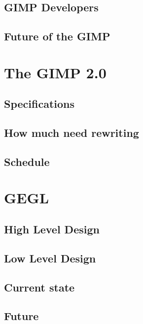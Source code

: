 \documentclass{report}
\begin{document}
\section{GIMP Developers}
\section{Future of the GIMP} 


\chapter{The GIMP 2.0}

\section{Specifications}
\section{How much need rewriting}
\section{Schedule}

\chapter{GEGL}

\section{High Level Design}

\section{Low Level Design}

\section{Current state}

\section{Future}

\end{document}
